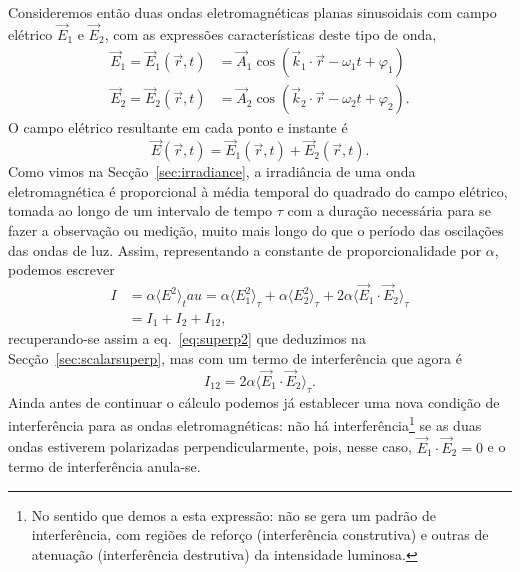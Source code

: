 Consideremos então duas ondas eletromagnéticas planas sinusoidais com campo
elétrico $\vec E_1$ e $\vec E_2$, com as expressões características deste tipo
de onda,
\begin{align*}
\vec E_1=\vec E_1(\vec r,t)&=\vec A_1\cos(\vec k_1\cdot \vec r-\omega_1
t+\varphi_1)\\
\vec E_2=\vec E_2(\vec r,t)&=\vec A_2\cos(\vec k_2\cdot \vec r-\omega_2
t+\varphi_2).
\end{align*}
O campo elétrico resultante em cada ponto e instante é
\begin{equation*}
\vec E(\vec r, t)=\vec E_1(\vec r,t)+\vec E_2(\vec r,t).
\end{equation*}
Como vimos na Secção~\ref{sec:irradiance}, a irradiância de uma onda
eletromagnética é proporcional à média temporal do quadrado do campo elétrico,
tomada ao longo de um intervalo de tempo $\tau$ com a duração necessária para se
fazer a observação ou medição, muito mais longo do que o período das oscilações
das ondas de luz. Assim, representando a constante de proporcionalidade por
$\alpha$, podemos escrever
\begin{align}
I&=\alpha\langle E^2 \rangle_tau=
  \alpha\langle E_1^2 \rangle_\tau+
  \alpha\langle E_2^2 \rangle_\tau+
  2\alpha\langle \vec E_1\cdot\vec E_2 \rangle_\tau\nonumber\\
  &=I_1+I_2+I_{12},\label{eq:resirrad}
\end{align}
recuperando-se assim a eq.~\eqref{eq:superp2} que deduzimos na
Secção~\ref{sec:scalarsuperp}, mas com um termo de interferência que agora é
\begin{equation}
  I_{12}=2\alpha\langle \vec E_1\cdot\vec E_2\rangle_\tau.
\end{equation}
Ainda antes de continuar o cálculo podemos já establecer uma nova condição de
interferência para as ondas eletromagnéticas: não há interferência\footnote{No
sentido que demos a esta expressão: não se gera um padrão de interferência, com
regiões de reforço (interferência construtiva) e outras de atenuação
(interferência destrutiva) da intensidade luminosa.} se as duas ondas estiverem
polarizadas perpendicularmente, pois, nesse caso, $\vec E_1\cdot\vec E_2=0$ e o
termo de interferência anula-se.

